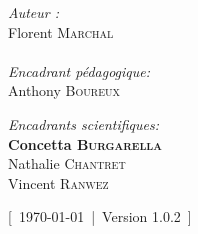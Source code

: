 \documentclass[../main]{subfiles} %
\begin{document}
\begin{titlepage}
\begin{center}
\noindent
\begin{minipage}{0.4\textwidth}
  \begin{flushleft} \large
    \emph{Auteur :}\\
    Florent \textsc{Marchal} \\
     \\
    \emph{Encadrant pédagogique:} \\
    Anthony \textsc{Boureux}\\
    
  \end{flushleft}
\end{minipage}
\begin{minipage}{0.5\textwidth}
  \begin{flushright} \large
    

    \emph{Encadrants scientifiques:} \\
    \textbf{Concetta \textsc{Burgarella}} \\
    Nathalie \textsc{Chantret} \\
    Vincent \textsc{Ranwez}
      \\
    

  \end{flushright}
\end{minipage}

\vfill

{\large [ \today  | Version 1.0.2 ]}

\end{center}
\end{titlepage}


\end{document}
